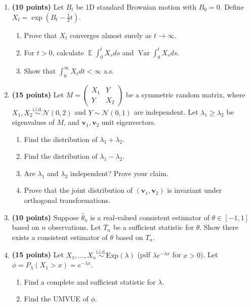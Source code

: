 \documentclass[11pt,a4paper]{article}
\DeclareMathOperator{\Var}{Var}
\DeclareMathOperator{\E}{\mathbb{E}}
\begin{document}
\begin{enumerate}[label=\textbf{\arabic*.}]
    \item \textbf{(10 points)} Let $B_t$ be 1D standard Brownian motion with $B_0 = 0$. Define $X_t = \exp(B_t - \frac{1}{2}t)$.
    \begin{enumerate}[label=(\alph*)]
        \item Prove that $X_t$ converges almost surely as $t \to \infty$.
        \item For $t > 0$, calculate $\E \int_0^t X_s ds$ and $\Var \int_0^t X_s ds$.
        \item Show that $\int_0^\infty X_t dt < \infty$ a.s.
    \end{enumerate}

    \item \textbf{(15 points)} Let $M = \begin{pmatrix} X_1 & Y \\ Y & X_2 \end{pmatrix}$ be a symmetric random matrix, where $X_1, X_2 \stackrel{\text{i.i.d.}}{\sim} \mathcal{N}(0, 2)$ and $Y \sim \mathcal{N}(0, 1)$ are independent. Let $\lambda_1 \ge \lambda_2$ be eigenvalues of $M$, and $\mathbf{v}_1, \mathbf{v}_2$ unit eigenvectors.
    \begin{enumerate}[label=(\alph*)]
        \item Find the distribution of $\lambda_1 + \lambda_2$.
        \item Find the distribution of $\lambda_1 - \lambda_2$.
        \item Are $\lambda_1$ and $\lambda_2$ independent? Prove your claim.
        \item Prove that the joint distribution of $(\mathbf{v}_1, \mathbf{v}_2)$ is invariant under orthogonal transformations.
    \end{enumerate}

    \item \textbf{(10 points)} Suppose $\hat{\theta}_n$ is a real-valued consistent estimator of $\theta \in [-1, 1]$ based on $n$ observations. Let $T_n$ be a sufficient statistic for $\theta$. Show there exists a consistent estimator of $\theta$ based on $T_n$.

    \item \textbf{(15 points)} Let $X_1, \dots, X_n \stackrel{\text{i.i.d.}}{\sim} \mathrm{Exp}(\lambda)$ (pdf $\lambda e^{-\lambda x}$ for $x > 0$). Let $\phi = P_\lambda(X_1 > x) = e^{-\lambda x}$.
    \begin{enumerate}[label=(\alph*)]
        \item Find a complete and sufficient statistic for $\lambda$.
        \item Find the UMVUE of $\phi$.
    \end{enumerate}


\end{enumerate}
\end{document}

